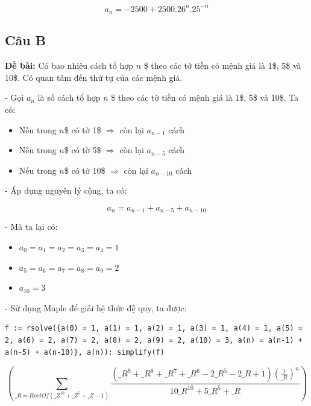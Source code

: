 \documentclass[12pt]{article}
\begin{document}
\begin{sloppypar}
\begin{equation*}
    a_{n} = -2500 + 2500.26^{n}.25^{-n}
\end{equation*}

\subsection{Câu B}
\begin{tcolorbox}
    \textbf{Đề bài:} Có bao nhiêu cách tổ hợp \(n\) \$ theo các tờ tiền có mệnh giá là 1\$, 5\$ và 10\$. Có quan tâm đến thứ tự của các mệnh giá.
\end{tcolorbox}

- Gọi \(a_{n}\) là số cách tổ hợp \(n\) \$ theo các tờ tiền có mệnh giá là 1\$, 5\$ và 10\$. Ta có:

\begin{itemize}
    \item Nếu trong \(n\)\$ có tờ 1\$ \(\Rightarrow\) còn lại \(a_{n-1}\) cách
    \item Nếu trong \(n\)\$ có tờ 5\$ \(\Rightarrow\) còn lại \(a_{n-5}\) cách
    \item Nếu trong \(n\)\$ có tờ 10\$ \(\Rightarrow\) còn lại \(a_{n-10}\) cách
\end{itemize}

- Áp dụng nguyên lý cộng, ta có:

\begin{equation*}
    a_{n} = a_{n-1} + a_{n-5} + a_{n-10}
\end{equation*}

- Mà ta lại có:

\begin{itemize}
    \item \(a_{0} = a_{1} = a_{2} = a_{3} = a_{4} = 1\)
    \item \(a_{5} = a_{6} = a_{7} = a_{8} = a_{9} = 2\)
    \item \(a_{10} = 3\)
\end{itemize}

- Sử dụng Maple để giải hệ thức đệ quy, ta được:

\begin{lstlisting}[breaklines]
    f := rsolve({a(0) = 1, a(1) = 1, a(2) = 1, a(3) = 1, a(4) = 1, a(5) = 2, a(6) = 2, a(7) = 2, a(8) = 2, a(9) = 2, a(10) = 3, a(n) = a(n-1) + a(n-5) + a(n-10)}, a(n)): simplify(f)
\end{lstlisting}



\begin{equation*}
    \left(\sum_{\_R = RootOf(\_Z^{10} + \_Z^{5} + \_Z-1)}\frac{(\_R^{9} + \_R^{8} + \_R^{7} + \_R^{6} - 2\_R^{5} - 2\_R + 1)(\frac{1}{\_R})^{n}}{10\_R^{10} + 5\_R^{5} + \_R}\right)
\end{equation*}


\end{sloppypar}
\end{document}
